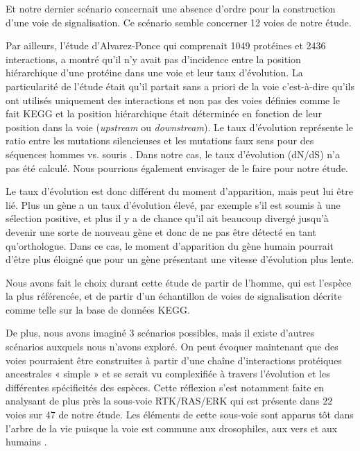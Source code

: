 \par Et notre dernier scénario concernait une absence d’ordre pour la construction d’une voie de signalisation. Ce scénario semble concerner 12 voies de notre étude. 
\par Par ailleurs, l’étude d’Alvarez-Ponce qui comprenait 1049 protéines et 2436 interactions, a montré qu’il n’y avait pas d’incidence entre la position hiérarchique d’une protéine dans une voie et leur taux d’évolution. La particularité de l’étude était qu’il partait sans a priori de la voie c’est-à-dire qu’ils ont utilisés uniquement des interactions et non pas des voies définies comme le fait KEGG et la position hiérarchique était déterminée en fonction de leur position dans la voie (\textit{upstream} ou \textit{downstream}). Le taux d’évolution représente le ratio entre les mutations silencieuses et les mutations faux sens pour des séquences hommes vs. souris \parencite{alvarez-ponce_relationship_2012}. Dans notre cas, le taux d’évolution (dN/dS) n’a pas été calculé. Nous pourrions également envisager de le faire pour notre étude.
\par Le taux d’évolution est donc différent du moment d’apparition, mais peut lui être lié. Plus un gène a un taux d’évolution élevé, par exemple s’il est soumis à une sélection positive, et plus il y a de chance qu’il ait beaucoup divergé jusqu’à devenir une sorte de nouveau gène et donc de ne pas être détecté en tant qu’orthologue. Dans ce cas, le moment d’apparition du gène humain pourrait d’être plus éloigné que pour un gène présentant une vitesse d’évolution plus lente. 
\par Nous avons fait le choix durant cette étude de partir de l’homme, qui est l’espèce la plus référencée, et de partir d’un échantillon de voies de signalisation décrite comme telle sur la base de données KEGG. 
\par De plus, nous avons imaginé 3 scénarios possibles, mais il existe d’autres scénarios auxquels nous n’avons exploré. On peut évoquer maintenant que des voies pourraient être construites à partir d’une chaîne d’interactions protéiques ancestrales « simple » et se serait vu complexifiée à travers l’évolution et les différentes spécificités des espèces. Cette réflexion s’est notamment faite en analysant de plus près la sous-voie RTK/RAS/ERK qui est présente dans 22 voies sur 47 de notre étude. Les éléments de cette sous-voie sont apparus tôt dans l’arbre de la vie puisque la voie est commune aux drosophiles, aux vers et aux humains \parencite{ashton-beaucage_signalisation_2010}. 

